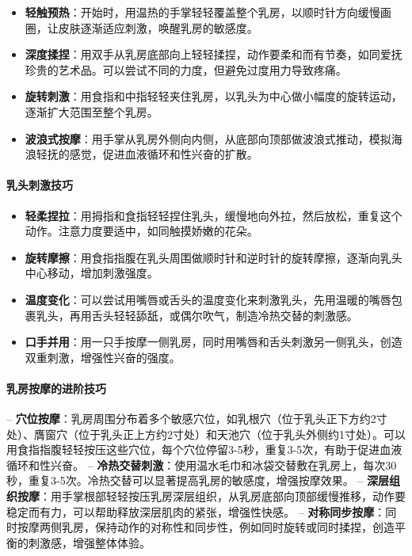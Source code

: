 \documentclass[12pt,UTF8]{ctexbook}
\begin{document}
\begin{itemize}
\item \textbf{轻触预热}：开始时，用温热的手掌轻轻覆盖整个乳房，以顺时针方向缓慢画圈，让皮肤逐渐适应刺激，唤醒乳房的敏感度。
\item \textbf{深度揉捏}：用双手从乳房底部向上轻轻揉捏，动作要柔和而有节奏，如同爱抚珍贵的艺术品。可以尝试不同的力度，但避免过度用力导致疼痛。
\item \textbf{旋转刺激}：用食指和中指轻轻夹住乳房，以乳头为中心做小幅度的旋转运动，逐渐扩大范围至整个乳房。
\item \textbf{波浪式按摩}：用手掌从乳房外侧向内侧，从底部向顶部做波浪式推动，模拟海浪轻抚的感觉，促进血液循环和性兴奋的扩散。
\end{itemize}

\paragraph{乳头刺激技巧}

\begin{itemize}
\item \textbf{轻柔捏拉}：用拇指和食指轻轻捏住乳头，缓慢地向外拉，然后放松，重复这个动作。注意力度要适中，如同触摸娇嫩的花朵。
\item \textbf{旋转摩擦}：用食指指腹在乳头周围做顺时针和逆时针的旋转摩擦，逐渐向乳头中心移动，增加刺激强度。
\item \textbf{温度变化}：可以尝试用嘴唇或舌头的温度变化来刺激乳头，先用温暖的嘴唇包裹乳头，再用舌头轻轻舔舐，或偶尔吹气，制造冷热交替的刺激感。
\item \textbf{口手并用}：用一只手按摩一侧乳房，同时用嘴唇和舌头刺激另一侧乳头，创造双重刺激，增强性兴奋的强度。
\end{itemize}

\paragraph{乳房按摩的进阶技巧}

-- \textbf{穴位按摩}：乳房周围分布着多个敏感穴位，如乳根穴（位于乳头正下方约2寸处）、膺窗穴（位于乳头正上方约2寸处）和天池穴（位于乳头外侧约1寸处）。可以用食指指腹轻轻按压这些穴位，每个穴位停留3-5秒，重复3-5次，有助于促进血液循环和性兴奋。
-- \textbf{冷热交替刺激}：使用温水毛巾和冰袋交替敷在乳房上，每次30秒，重复3-5次。冷热交替可以显著提高乳房的敏感度，增强按摩效果。
-- \textbf{深层组织按摩}：用手掌根部轻轻按压乳房深层组织，从乳房底部向顶部缓慢推移，动作要稳定而有力，可以帮助释放深层肌肉的紧张，增强性快感。
-- \textbf{对称同步按摩}：同时按摩两侧乳房，保持动作的对称性和同步性，例如同时旋转或同时揉捏，创造平衡的刺激感，增强整体体验。
\end{document}
